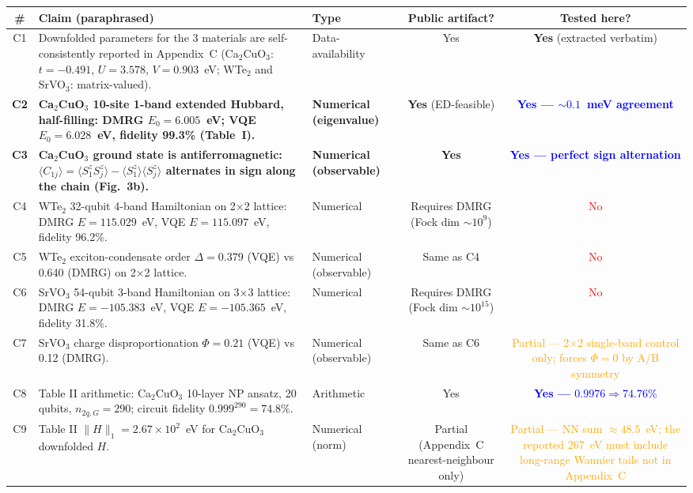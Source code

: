\documentclass[11pt]{article}
\begin{document}
\begin{longtable}{c p{7.5cm} l c c}
\toprule
\# & Claim (paraphrased) & Type & Public artifact? & Tested here? \\
\midrule
C1 & Downfolded parameters for the 3 materials are self-consistently reported in Appendix~C (Ca$_2$CuO$_3$: $t=-0.491$, $U=3.578$, $V=0.903$~eV; WTe$_2$ and SrVO$_3$: matrix-valued). & Data-availability & Yes & \textbf{Yes} (extracted verbatim) \\
\midrule
\textbf{C2} & \textbf{Ca$_2$CuO$_3$ 10-site 1-band extended Hubbard, half-filling: DMRG $E_0 = 6.005$~eV; VQE $E_0 = 6.028$~eV, fidelity 99.3\% (Table~I).} & \textbf{Numerical (eigenvalue)} & \textbf{Yes} (ED-feasible) & \textbf{\textcolor{blue}{Yes --- $\sim 0.1$~meV agreement}} \\
\midrule
\textbf{C3} & \textbf{Ca$_2$CuO$_3$ ground state is antiferromagnetic: $\langle C_{1j}\rangle = \langle S^z_1 S^z_j\rangle - \langle S^z_1\rangle\langle S^z_j\rangle$ alternates in sign along the chain (Fig.~3b).} & \textbf{Numerical (observable)} & \textbf{Yes} & \textbf{\textcolor{blue}{Yes --- perfect sign alternation}} \\
\midrule
C4 & WTe$_2$ 32-qubit 4-band Hamiltonian on 2$\times$2 lattice: DMRG $E=115.029$~eV, VQE $E=115.097$~eV, fidelity 96.2\%. & Numerical & Requires DMRG (Fock dim $\sim 10^9$) & \textcolor{red}{No} \\
\midrule
C5 & WTe$_2$ exciton-condensate order $\Delta = 0.379$ (VQE) vs 0.640 (DMRG) on 2$\times$2 lattice. & Numerical (observable) & Same as C4 & \textcolor{red}{No} \\
\midrule
C6 & SrVO$_3$ 54-qubit 3-band Hamiltonian on 3$\times$3 lattice: DMRG $E = -105.383$~eV, VQE $E = -105.365$~eV, fidelity 31.8\%. & Numerical & Requires DMRG (Fock dim $\sim 10^{15}$) & \textcolor{red}{No} \\
\midrule
C7 & SrVO$_3$ charge disproportionation $\Phi = 0.21$ (VQE) vs 0.12 (DMRG). & Numerical (observable) & Same as C6 & \textcolor{orange}{Partial --- 2$\times$2 single-band control only; forces $\Phi=0$ by A/B symmetry} \\
\midrule
C8 & Table II arithmetic: Ca$_2$CuO$_3$ 10-layer NP ansatz, 20 qubits, $n_{2q,G}=290$; circuit fidelity $0.999^{290}=74.8\%$. & Arithmetic & Yes & \textbf{\textcolor{blue}{Yes --- $0.9976 \Rightarrow 74.76\%$}} \\
\midrule
C9 & Table II $\|H\|_1 = 2.67\times 10^2$~eV for Ca$_2$CuO$_3$ downfolded $H$. & Numerical (norm) & Partial (Appendix~C nearest-neighbour only) & \textcolor{orange}{Partial --- NN sum $\approx 48.5$~eV; the reported 267~eV must include long-range Wannier tails not in Appendix~C} \\
\bottomrule
\end{longtable}
\end{document}
